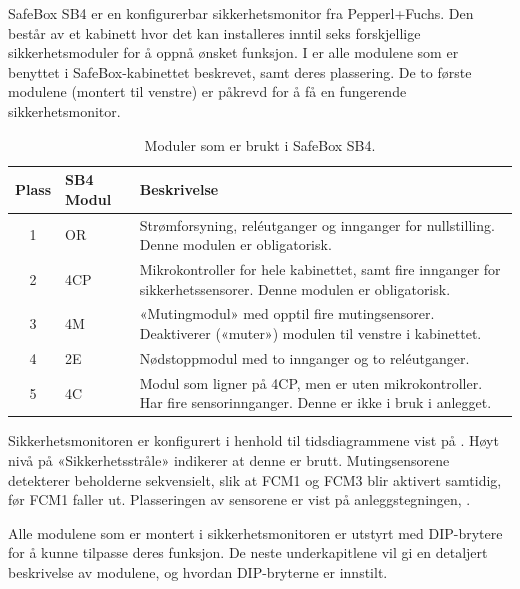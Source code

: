 \documentclass[Visionprosjekt.tex]{subfiles}
\begin{document}
SafeBox SB4 er en konfigurerbar sikkerhetsmonitor fra Pepperl+Fuchs. Den består av et kabinett hvor det kan installeres inntil seks forskjellige sikkerhetsmoduler for å oppnå ønsket funksjon. I  er  alle modulene som er benyttet i SafeBox-kabinettet beskrevet, samt deres plassering. De to første modulene (montert til venstre) er påkrevd for å få en fungerende sikkerhetsmonitor. 



\begin{table}[ht]
\centering
    \caption{Moduler som er brukt i SafeBox SB4.}
    \renewcommand\arraystretch{1.2}
    \small
    \begin{tabularx}{\textwidth}{clX}        
        \toprule
        Plass	&	SB4 Modul &	Beskrivelse																			\\
        \midrule
        1		&	OR	  &	Strømforsyning, reléutganger og innganger for nullstilling. Denne modulen er obligatorisk.						\\
        2		&	4CP	  &	Mikrokontroller for hele kabinettet, samt fire innganger for sikkerhetssensorer. 
        Denne modulen er obligatorisk.						\\
        3		&	4M	  &	«Mutingmodul» med opptil fire mutingsensorer. Deaktiverer («muter») modulen til venstre i kabinettet.			\\
        4		&	2E	  &	Nødstoppmodul med to innganger og to reléutganger. 							\\
        5		&   4C	  &	Modul som ligner på 4CP, men er uten mikrokontroller. Har fire sensorinnganger.	Denne er ikke i bruk i anlegget.\\
       \bottomrule
    \end{tabularx}
    \label{tab:sbmoduler}
\end{table}



Sikkerhetsmonitoren er konfigurert i henhold  til tidsdiagrammene vist på . Høyt nivå på «Sikkerhetsstråle» indikerer at denne er brutt.
Mutingsensorene detekterer beholderne sekvensielt, slik at FCM1 og FCM3 blir aktivert samtidig, før FCM1 faller ut. Plasseringen av sensorene er vist på anleggstegningen, .


Alle modulene som er montert i sikkerhetsmonitoren er utstyrt med DIP-brytere for å kunne tilpasse deres funksjon. De neste underkapitlene vil gi en detaljert beskrivelse av modulene, og hvordan  DIP-bryterne er innstilt.
\end{document}
